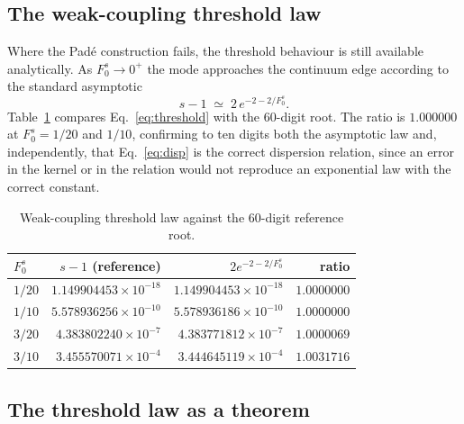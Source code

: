 \documentclass[11pt,a4paper]{article}
\newcommand{\Fzs}{F_0^{s}}
\begin{document}
\subsection{The weak-coupling threshold law}

Where the Pad\'e construction fails, the threshold behaviour is still available
analytically. As $\Fzs \to 0^{+}$ the mode approaches the continuum edge
according to the standard asymptotic
\begin{equation}
  s - 1 \;\simeq\; 2\,e^{-2-2/\Fzs}.
  \label{eq:threshold}
\end{equation}
Table~\ref{tab:thresh} compares Eq.~\eqref{eq:threshold} with the $60$-digit
root. The ratio is $1.000000$ at $\Fzs = 1/20$ and $1/10$, confirming to ten
digits both the asymptotic law and, independently, that
Eq.~\eqref{eq:disp} is the correct dispersion relation, since an error in the
kernel or in the relation would not reproduce an exponential law with the
correct constant.

\begin{table}[htbp]
\centering
\caption{Weak-coupling threshold law against the $60$-digit reference root.}
\label{tab:thresh}
\begin{tabular}{lrrr}
\toprule
$\Fzs$ & $s-1$ (reference) & $2e^{-2-2/\Fzs}$ & ratio \\
\midrule
$1/20$ & $1.149904453\times10^{-18}$ & $1.149904453\times10^{-18}$ & $1.0000000$ \\
$1/10$ & $5.578936256\times10^{-10}$ & $5.578936186\times10^{-10}$ & $1.0000000$ \\
$3/20$ & $4.383802240\times10^{-7}$  & $4.383771812\times10^{-7}$  & $1.0000069$ \\
$3/10$ & $3.455570071\times10^{-4}$  & $3.444645119\times10^{-4}$  & $1.0031716$ \\
\bottomrule
\end{tabular}
\end{table}

\subsection{The threshold law as a theorem}
\label{sec:bracket}
\end{document}
